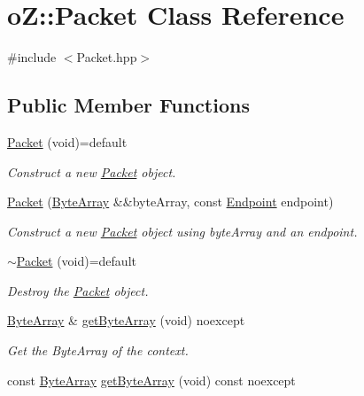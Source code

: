 \hypertarget{classo_z_1_1_packet}{}\section{oZ\+::Packet Class Reference}
\label{classo_z_1_1_packet}


{\ttfamily \#include $<$Packet.\+hpp$>$}

\subsection*{Public Member Functions}
\begin{DoxyCompactItemize}
\item 
\mbox{\hyperlink{classo_z_1_1_packet_a5c96f8d5db686e035b199e8aeb0e0cea}{Packet}} (void)=default
\begin{DoxyCompactList}\small\item\em Construct a new \mbox{\hyperlink{classo_z_1_1_packet}{Packet}} object. \end{DoxyCompactList}\item 
\mbox{\hyperlink{classo_z_1_1_packet_a0d77934c04128b52f1dae887ca198051}{Packet}} (\mbox{\hyperlink{namespaceo_z_abfa3f5a46e5c7584615dc1dd33fcafb6}{Byte\+Array}} \&\&byte\+Array, const \mbox{\hyperlink{classo_z_1_1_endpoint}{Endpoint}} endpoint)
\begin{DoxyCompactList}\small\item\em Construct a new \mbox{\hyperlink{classo_z_1_1_packet}{Packet}} object using byte\+Array and an endpoint. \end{DoxyCompactList}\item 
\mbox{\hyperlink{classo_z_1_1_packet_a01d80a0c452b1e07dfd160f494be2af5}{$\sim$\+Packet}} (void)=default
\begin{DoxyCompactList}\small\item\em Destroy the \mbox{\hyperlink{classo_z_1_1_packet}{Packet}} object. \end{DoxyCompactList}\item 
\mbox{\hyperlink{namespaceo_z_abfa3f5a46e5c7584615dc1dd33fcafb6}{Byte\+Array}} \& \mbox{\hyperlink{classo_z_1_1_packet_a8a5d791e4675a3f065928884b64fe7bf}{get\+Byte\+Array}} (void) noexcept
\begin{DoxyCompactList}\small\item\em Get the Byte\+Array of the context. \end{DoxyCompactList}\item 
const \mbox{\hyperlink{namespaceo_z_abfa3f5a46e5c7584615dc1dd33fcafb6}{Byte\+Array}} \mbox{\hyperlink{classo_z_1_1_packet_a4919e1356309ad8c9d7595052d0ca498}{get\+Byte\+Array}} (void) const noexcept

\end{DoxyCompactItemize}
